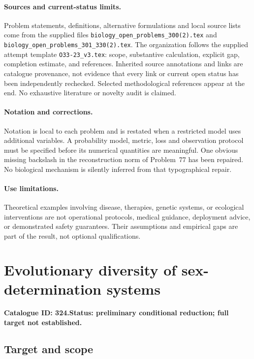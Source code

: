 \documentclass[11pt]{article}
\begin{document}
\paragraph{Sources and current-status limits.}
Problem statements, definitions, alternative formulations and local source lists
come from the supplied files
\texttt{biology\_open\_problems\_300(2).tex} and
\texttt{biology\_open\_problems\_301\_330(2).tex}.
The organization follows the supplied attempt template
\texttt{O33-23\_v3.tex}: scope, substantive calculation, explicit gap,
completion estimate, and references. Inherited source annotations and links are
catalogue provenance, not evidence that every link or current open status has
been independently rechecked. Selected methodological references appear at the
end. No exhaustive literature or novelty audit is claimed.

\paragraph{Notation and corrections.}
Notation is local to each problem and is restated when a restricted model uses
additional variables. A probability model, metric, loss and observation protocol
must be specified before its numerical quantities are meaningful. One obvious
missing backslash in the reconstruction norm of Problem~77 has been repaired.
No biological mechanism is silently inferred from that typographical repair.

\paragraph{Use limitations.}
Theoretical examples involving disease, therapies, genetic systems, or ecological
interventions are not operational protocols, medical guidance, deployment advice,
or demonstrated safety guarantees. Their assumptions and empirical gaps are part
of the result, not optional qualifications.

\setcounter{section}{323}
\section{Evolutionary diversity of sex-determination systems}
\label{prob:324}
\noindent\textbf{Catalogue ID: 324.}\quad \textbf{Status: preliminary conditional reduction; full target not established.}
\subsection{Target and scope}
\end{document}
